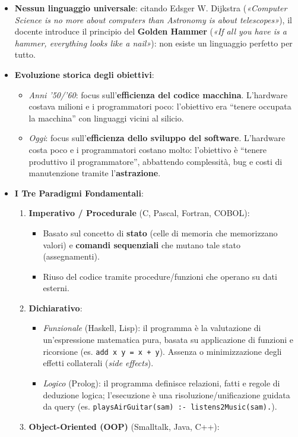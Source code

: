 \documentclass[11pt,a4paper]{article}
\newcommand{\passthrough}[1]{#1}
\providecommand{\tightlist}{\setlength{\itemsep}{0pt}\setlength{\parskip}{0pt}}
\begin{document}
\begin{itemize}
\tightlist
\item
  \textbf{Nessun linguaggio universale}: citando Edsger W. Dijkstra
  (\emph{«Computer Science is no more about computers than Astronomy is
  about telescopes»}), il docente introduce il principio del
  \textbf{Golden Hammer} (\emph{«If all you have is a hammer, everything
  looks like a nail»}): non esiste un linguaggio perfetto per tutto.
\item
  \textbf{Evoluzione storica degli obiettivi}:

  \begin{itemize}
  \tightlist
  \item
    \emph{Anni '50/'60}: focus sull'\textbf{efficienza del codice
    macchina}. L'hardware costava milioni e i programmatori poco:
    l'obiettivo era ``tenere occupata la macchina'' con linguaggi vicini
    al silicio.
  \item
    \emph{Oggi}: focus sull'\textbf{efficienza dello sviluppo del
    software}. L'hardware costa poco e i programmatori costano molto:
    l'obiettivo è ``tenere produttivo il programmatore'', abbattendo
    complessità, bug e costi di manutenzione tramite
    l'\textbf{astrazione}.
  \end{itemize}
\item
  \textbf{I Tre Paradigmi Fondamentali}:

  \begin{enumerate}
  \def\labelenumi{\arabic{enumi}.}
  \tightlist
  \item
    \textbf{Imperativo / Procedurale} (C, Pascal, Fortran, COBOL):

    \begin{itemize}
    \tightlist
    \item
      Basato sul concetto di \textbf{stato} (celle di memoria che
      memorizzano valori) e \textbf{comandi sequenziali} che mutano tale
      stato (assegnamenti).
    \item
      Riuso del codice tramite procedure/funzioni che operano su dati
      esterni.
    \end{itemize}
  \item
    \textbf{Dichiarativo}:

    \begin{itemize}
    \tightlist
    \item
      \emph{Funzionale} (Haskell, Lisp): il programma è la valutazione
      di un'espressione matematica pura, basata su applicazione di
      funzioni e ricorsione (es.
      \passthrough{\lstinline!add x y = x + y!}). Assenza o
      minimizzazione degli effetti collaterali (\emph{side effects}).
    \item
      \emph{Logico} (Prolog): il programma definisce relazioni, fatti e
      regole di deduzione logica; l'esecuzione è una
      risoluzione/unificazione guidata da query (es.
      \passthrough{\lstinline!playsAirGuitar(sam) :- listens2Music(sam).!}).
    \end{itemize}
  \item
    \textbf{Object-Oriented (OOP)} (Smalltalk, Java, C++):


\end{enumerate}
\end{itemize}
\end{document}
